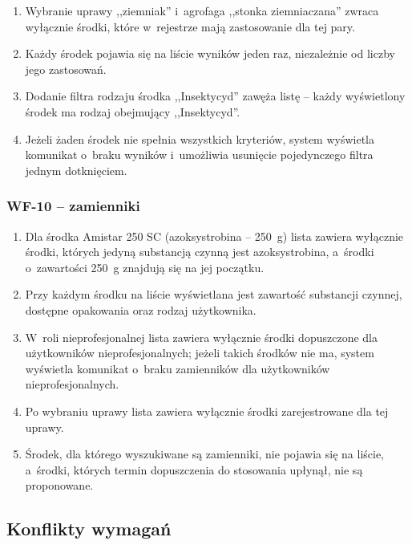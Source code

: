 \begin{enumerate}
    \item Wybranie uprawy ,,ziemniak'' i~agrofaga ,,stonka ziemniaczana''
    zwraca wyłącznie środki, które w~rejestrze mają zastosowanie dla tej
    pary.
    \item Każdy środek pojawia się na liście wyników jeden raz, niezależnie od
    liczby jego zastosowań.
    \item Dodanie filtra rodzaju środka ,,Insektycyd'' zawęża listę -- każdy
    wyświetlony środek ma rodzaj obejmujący ,,Insektycyd''.
    \item Jeżeli żaden środek nie spełnia wszystkich kryteriów, system
    wyświetla komunikat o~braku wyników i~umożliwia usunięcie pojedynczego
    filtra jednym dotknięciem.
\end{enumerate}

\subsubsection{WF-10 -- zamienniki}

\begin{enumerate}
    \item Dla środka Amistar 250 SC (azoksystrobina -- 250~g) lista zawiera
    wyłącznie środki, których jedyną substancją czynną jest azoksystrobina,
    a~środki o~zawartości 250~g znajdują się na jej początku.
    \item Przy każdym środku na liście wyświetlana jest zawartość substancji
    czynnej, dostępne opakowania oraz rodzaj użytkownika.
    \item W~roli nieprofesjonalnej lista zawiera wyłącznie środki dopuszczone
    dla użytkowników nieprofesjonalnych; jeżeli takich środków nie ma, system
    wyświetla komunikat o~braku zamienników dla użytkowników
    nieprofesjonalnych.
    \item Po wybraniu uprawy lista zawiera wyłącznie środki zarejestrowane dla
    tej uprawy.
    \item Środek, dla którego wyszukiwane są zamienniki, nie pojawia się na
    liście, a~środki, których termin dopuszczenia do stosowania upłynął, nie są
    proponowane.
\end{enumerate}

\subsection{Konflikty wymagań}

